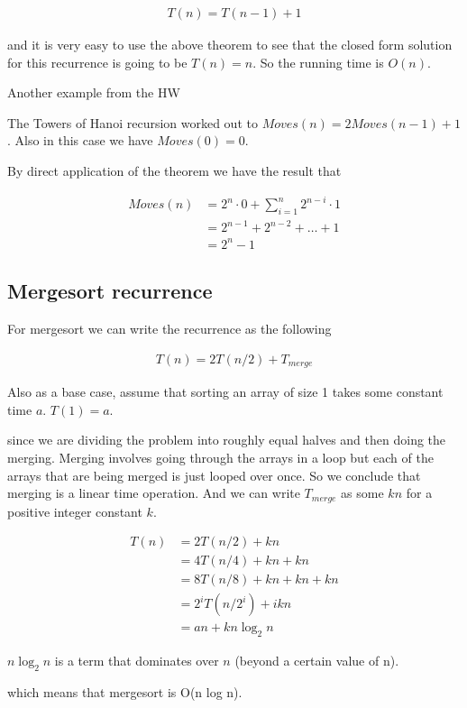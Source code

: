 \documentclass[12pt]{article}
\begin{document}
\begin{align*}
T(n) = T(n-1) + 1
\end{align*}

and it is very easy to use the above theorem to see that the closed form solution for this recurrence is going to be $T(n) = n$. So the running time is $O(n)$.

\medskip

Another example from the HW

The Towers of Hanoi recursion worked out to $Moves(n) = 2Moves(n-1) + 1$. Also in this case we have $Moves(0) = 0$.

By direct application of the theorem we have the result that

\begin{align*}
Moves(n) &= 2^n \cdot 0+ \sum_{i=1}^n 2^{n-i} \cdot 1 \\
&=  2^{n-1} + 2^{n-2} + \ldots + 1 \\
&= 2^{n} - 1
\end{align*}

\subsection*{Mergesort recurrence}

For mergesort we can write the recurrence as the following

\begin{align*}
T(n) = 2T(n/2) + T_{merge}
\end{align*}

Also as a base case, assume that sorting an array of size 1 takes some constant time $a$. $T(1) = a$.

since we are dividing the problem into roughly equal halves and then doing the merging. Merging involves going through the arrays in a loop but each of the arrays that are being merged is just looped over once. So we conclude that merging is a linear time operation. And we can write $T_{merge}$ as some $kn$ for a positive integer constant $k$.

\begin{align*}
T(n) &= 2T(n/2) + kn \\
&= 4T(n/4) + kn + kn \\
&= 8T(n/8) + kn + kn + kn \\
&= 2^i T(n/2^i) + ikn\\
&= an + kn \log_2 n 
\end{align*}

$n \log_2 n$ is a term that dominates over $n$ (beyond a certain value of n).

which means that mergesort is O(n log n).
\end{document}
